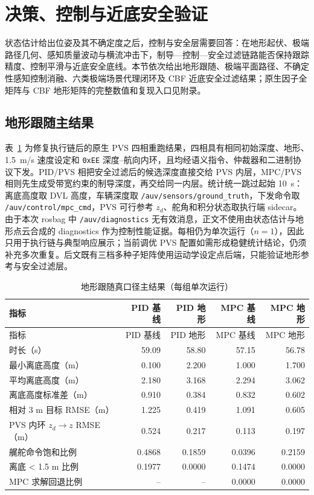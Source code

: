 \section{决策、控制与近底安全验证}\label{sec:ch05-5-ctrl}

状态估计给出位姿及其不确定度之后，控制与安全层需要回答：在地形起伏、极端路径几何、感知质量波动与横流冲击下，制导—控制—安全过滤链路能否保持跟踪精度、控制平滑与近底安全底线。本节依次给出地形跟随、极端平面路径、不确定性感知控制消融、六类极端场景代理闭环及 CBF 近底安全过滤结果；原生因子全矩阵与 CBF 地形矩阵的完整数值和复现入口见附录。

\subsection{地形跟随主结果}\label{sec:ch05-5-5-2}

表~\ref{tab:ch05-terrain-main} 为修复执行链后的原生 PVS 四相重跑结果，四相具有相同初始深度、地形、1.5~m/s 速度设定和 \texttt{0xEE} 深度--航向内环，且均经语义指令、仲裁器和二进制协议下发。PID/PVS 相把安全过滤后的候选深度直接交给 PVS 内层，MPC/PVS 相则先生成受带宽约束的制导深度，再交给同一内层。统计统一跳过起始 10~s：离底高度取 DVL 高度，车辆深度取 \texttt{/auv/sensors/ground\_truth}，下发命令取 \texttt{/auv/control/mpc\_cmd}，PVS 可行参考 \(z_d\)、舵角和积分状态取执行端 sidecar。由于本次 rosbag 中 \texttt{/auv/diagnostics} 无有效消息，正文不使用由状态估计与地形点云合成的 diagnostics 作为控制性能证据。每相仍为单次运行（\(n=1\)），因此只用于执行链与典型响应展示；当前调优 PVS 配置如需形成稳健统计结论，仍须补充多次重复。后文既有三档多种子矩阵使用运动学设定点后端，只能验证地形参考与安全过滤层。

\begin{longtable}[]{@{}lrrrr@{}}
\caption{地形跟随真口径主结果（每组单次运行）}\label{tab:ch05-terrain-main}\tabularnewline
\toprule\noalign{}
指标 & PID 基线 & PID 地形 & MPC 基线 & MPC 地形 \\
\midrule\noalign{}
\endfirsthead
\toprule\noalign{}
指标 & PID 基线 & PID 地形 & MPC 基线 & MPC 地形 \\
\midrule\noalign{}
\endhead
\bottomrule\noalign{}
\endlastfoot
时长（s） & 59.09 & 58.80 & 57.15 & 56.78 \\
最小离底高度（m） & 0.100 & 2.200 & 1.000 & 1.700 \\
平均离底高度（m） & 2.180 & 3.168 & 2.294 & 3.062 \\
离底高度标准差（m） & 0.910 & 0.384 & 0.832 & 0.602 \\
相对 3 m 目标 RMSE（m） & 1.225 & 0.419 & 1.091 & 0.605 \\
PVS 内环 \(z_d\!\rightarrow z\) RMSE（m） & 0.524 & 0.217 & 0.113 & 0.197 \\
艉舵命令饱和比例 & 0.4868 & 0.1859 & 0.0396 & 0.2159 \\
离底 \textless{} 1.5 m 比例 & 0.1977 & 0.0000 & 0.1474 & 0.0000 \\
MPC 求解回退比例 & -- & -- & 0.0000 & 0.0000 \\
\end{longtable}

